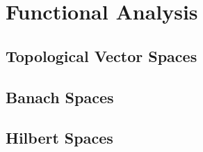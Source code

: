 \part{Functional Analysis}

\chapter{Topological Vector Spaces}

\chapter{Banach Spaces}

\chapter{Hilbert Spaces}